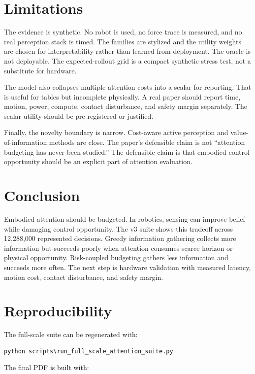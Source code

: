 \documentclass{article}
\begin{document}
\section{Limitations}

The evidence is synthetic. No robot is used, no force trace is measured, and
no real perception stack is timed. The families are stylized and the utility
weights are chosen for interpretability rather than learned from deployment.
The oracle is not deployable. The expected-rollout grid is a compact synthetic
stress test, not a substitute for hardware.

The model also collapses multiple attention costs into a scalar for reporting.
That is useful for tables but incomplete physically. A real paper should report
time, motion, power, compute, contact disturbance, and safety margin
separately. The scalar utility should be pre-registered or justified.

Finally, the novelty boundary is narrow. Cost-aware active perception and
value-of-information methods are close. The paper's defensible claim is not
``attention budgeting has never been studied.'' The defensible claim is that
embodied control opportunity should be an explicit part of attention
evaluation.

\section{Conclusion}

Embodied attention should be budgeted. In robotics, sensing can improve belief
while damaging control opportunity. The v3 suite shows this tradeoff across
12,288,000 represented decisions. Greedy information gathering collects more
information but succeeds poorly when attention consumes scarce horizon or
physical opportunity. Risk-coupled budgeting gathers less information and
succeeds more often. The next step is hardware validation with measured
latency, motion cost, contact disturbance, and safety margin.

\section{Reproducibility}

The full-scale suite can be regenerated with:

\begin{verbatim}
python scripts\run_full_scale_attention_suite.py
\end{verbatim}

The final PDF is built with:
\end{document}
